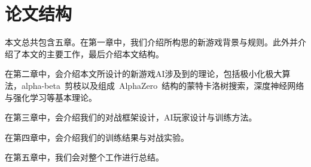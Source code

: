 \section{论文结构}
本文总共包含五章。在第一章中，我们介绍所构思的新游戏背景与规则。此外并介绍了本文的主要工作，最后介绍本文结构。

在第二章中，会介绍本文所设计的新游戏AI涉及到的理论，包括极小化极大算法，alpha-beta~剪枝以及组成~AlphaZero~结构的蒙特卡洛树搜索，深度神经网络与强化学习等基本理论。

在第三章中，会介绍我们的对战框架设计，AI玩家设计与训练方法。

在第四章中，会介绍我们的训练结果与对战实验。

在第五章中，我们会对整个工作进行总结。

